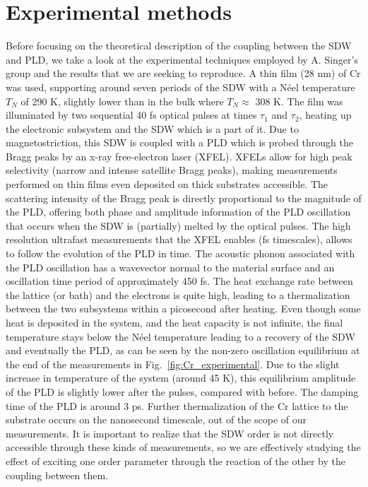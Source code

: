 \section{Experimental methods}
Before focusing on the theoretical description of the coupling between the SDW and PLD, we take a look at the experimental techniques employed by A. Singer's group and the results that we are seeking to reproduce.
A thin film (28 nm) of Cr was used, supporting around seven periods of the SDW with a N\'eel temperature $T_N$ of 290 K, slightly lower than in the bulk where $T_N\approx$ 308 K.
The film was illuminated by two sequential 40 fs optical pulses at times $\tau_1$ and $\tau_2$, heating up the electronic subsystem and the SDW which is a part of it.
Due to magnetostriction, this SDW is coupled with a PLD which is probed through the Bragg peaks by an x-ray free-electron laser (XFEL)\cite{Singer2015}.
XFELs allow for high peak selectivity (narrow and intense satellite Bragg peaks), making measurements performed on thin films even deposited on thick substrates accessible.
The scattering intensity of the Bragg peak is directly proportional to the magnitude of the PLD, offering both phase and amplitude information of the PLD oscillation that occurs when the SDW is (partially) melted by the optical pulses.
The high resolution ultrafast measurements that the XFEL enables (fs timescales), allows to follow the evolution of the PLD in time.
The acoustic phonon associated with the PLD oscillation has a wavevector normal to the material surface and an oscillation time period of approximately 450 fs.
The heat exchange rate between the lattice (or bath) and the electrons is quite high, leading to a thermalization between the two subsystems within a picosecond after heating.
Even though some heat is deposited in the system, and the heat capacity is not infinite, the final temperature stays below the N\'eel temperature leading to a recovery of the SDW and eventually the PLD, as can be seen by the non-zero oscillation equilibrium at the end of the measurements in Fig.~\ref{fig:Cr_experimental}.
Due to the slight increase in temperature of the system (around 45 K), this equilibrium amplitude of the PLD is slightly lower after the pulses, compared with before.
The damping time of the PLD is around 3 ps.
Further thermalization of the Cr lattice to the substrate occurs on the nanosecond timescale, out of the scope of our measurements.
It is important to realize that the SDW order is not directly accessible through these kinds of measurements, so we are effectively studying the effect of exciting one order parameter through the reaction of the other by the coupling between them.

